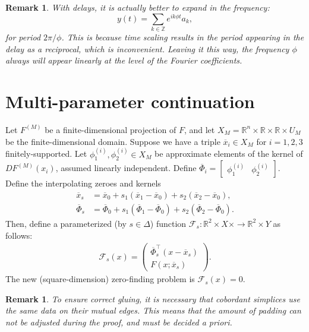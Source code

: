 \documentclass[10pt]{article}
\newcommand{\R}{\mathbb{R}}
\newcommand{\Z}{\mathbb{Z}}
\newtheorem{remark}[rem]{Remark}
\begin{document}
\begin{remark}
With delays, it is actually better to expand in the frequency: $$y(t) = \sum_{k\in\Z}e^{ik\phi t}a_k,$$ for period $2\pi/\phi$. This is because time scaling results in the period appearing in the delay as a reciprocal, which is inconvenient. Leaving it this way, the frequency $\phi$ always will appear linearly at the level of the Fourier coefficients.
\end{remark}

\section{Multi-parameter continuation}\label{sec-cont}
Let $F^{(M)}$ be a finite-dimensional projection of $F$, and let $X_M=\R^n\times\R\times\R\times U_M$ be the finite-dimensional domain. Suppose we have a triple $\overline x_i\in X_M$ for $i=1,2,3$ finitely-supported. Let $\phi^{(i)}_1,\phi^{(i)}_2\in X_M$ be approximate elements of the kernel of $DF^{(M)}(x_i)$, assumed linearly independent. Define $\overline\Phi_i=[\begin{array}{cc}\phi^{(i)}_1&\phi^{(i)}_2\end{array}]$. Define the interpolating zeroes and kernels
\begin{align*}
\overline x_s&=\overline x_0 + s_1(\overline x_1-\overline x_0) + s_2(\overline x_2-\overline x_0),\\
\overline\Phi_s&=\overline\Phi_0 + s_1(\overline\Phi_1-\overline\Phi_0) + s_2(\overline\Phi_2 - \overline\Phi_0).
\end{align*}
Then, define a parameterized (by $s\in\Delta$) function $\mathcal{F}_s:\R^2\times X\times\rightarrow \R^2\times Y$ as follows:
\begin{align}
\label{multipara-F}\mathcal{F}_s(x)=\left(\begin{array}{c}\overline\Phi_s^\intercal(x-\overline x_s) \\  F(x;\overline x_s)\end{array}\right).
\end{align}
The new (square-dimension) zero-finding problem is $\mathcal{F}_s(x)=0$.

\begin{remark}
To ensure correct gluing, it is necessary that cobordant simplices use the same data on their mutual edges. This means that the amount of padding can not be adjusted during the proof, and must be decided a priori.
\end{remark}
\end{document}
